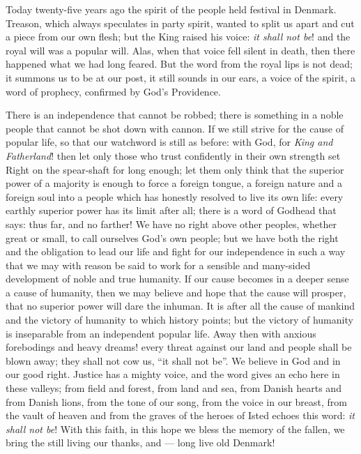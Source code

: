 \documentclass[12pt,a4paper,openany]{book}
\newcommand{\opage}[1]{\marginnote{\footnotesize\textit{[#1]}}}
\begin{document}
Today twenty-five years ago the spirit of the people held
festival in Denmark. Treason, which always
speculates in party spirit, wanted to split us apart and cut
a piece from our own flesh; but the King raised
his voice: \emph{it shall not be}! and the royal
will was a popular will. Alas, when that voice
fell silent in death, then there happened what we had long
feared. But the word from the royal lips is
not dead; it summons us to be at our post, it
still sounds in our ears, a voice of the spirit, a word of prophecy,
confirmed by God's Providence.

There is an independence that cannot be robbed;
there is something in a noble people that cannot be shot down
with cannon. If we still strive for the cause of popular life,
so that our watchword is still as before: with God, for
\emph{King and Fatherland}! then let only those who trust
confidently in their own strength set Right on the spear-shaft for long enough;
let them only think that the superior power of a majority is
enough to force a foreign tongue, a foreign nature
and a foreign soul into a people which has honestly resolved
to live its own life: every earthly superior power
has its limit after all; there is a word of Godhead
that says: thus far, and no farther! We have no right
above other peoples, whether great or small, to call
ourselves God's own people; but we have both the right and the obligation
to lead our life and fight for our independence
in such a way that we may with reason be said to
work for a sensible and many-sided development of noble and
true humanity. If our cause becomes in a deeper sense
a cause of humanity, then we may believe and
\setcounter{footnote}{0}%
\opage{164}hope that the cause will prosper, that no superior power
will dare the inhuman. It is after all the cause of mankind
and the victory of humanity to which history
points; but the victory of humanity is inseparable
from an independent popular life. Away then with
anxious forebodings and heavy dreams! every threat against
our land and people shall be blown away; they shall not cow us,
``it shall not be''. We believe in God and in our good
right. Justice has a mighty voice, and the word
gives an echo here in these valleys; from field and forest, from
land and sea, from Danish hearts and from Danish lions,
from the tone of our song, from the voice in our breast, from
the vault of heaven and from the graves of the heroes of Isted echoes
this word: \emph{it shall not be}! With this faith, in this
hope we bless the memory of the fallen, we bring the still
living our thanks, and --- long live old Denmark!
\end{document}
